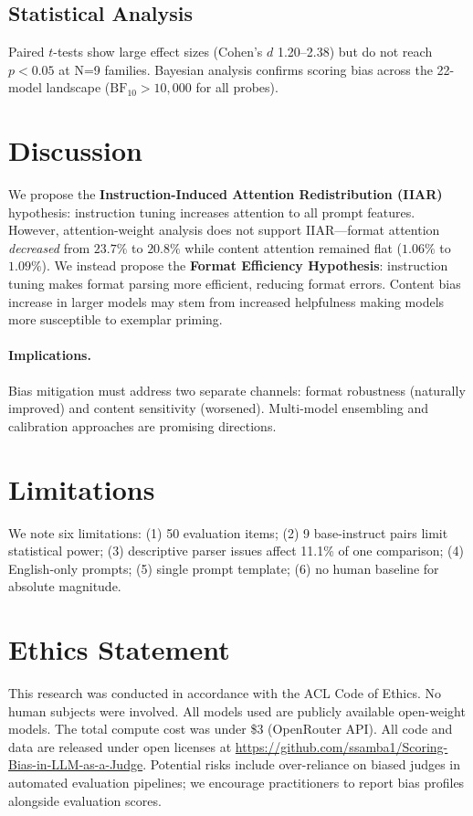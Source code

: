\documentclass[11pt,a4paper]{article}
\begin{document}
\subsection{Statistical Analysis}
Paired $t$-tests show large effect sizes (Cohen's $d$ 1.20--2.38) but do not reach $p<0.05$ at N=9 families. Bayesian analysis confirms scoring bias across the 22-model landscape ($\text{BF}_{10}>10{,}000$ for all probes).

\section{Discussion}

We propose the \textbf{Instruction-Induced Attention Redistribution (IIAR)} hypothesis: instruction tuning increases attention to all prompt features. However, attention-weight analysis does not support IIAR---format attention \emph{decreased} from $23.7\%$ to $20.8\%$ while content attention remained flat ($1.06\%$ to $1.09\%$). We instead propose the \textbf{Format Efficiency Hypothesis}: instruction tuning makes format parsing more efficient, reducing format errors. Content bias increase in larger models may stem from increased helpfulness making models more susceptible to exemplar priming.

\paragraph{Implications.} Bias mitigation must address two separate channels: format robustness (naturally improved) and content sensitivity (worsened). Multi-model ensembling and calibration approaches are promising directions.

\section{Limitations}

We note six limitations: (1) 50 evaluation items; (2) 9 base-instruct pairs limit statistical power; (3) descriptive parser issues affect 11.1\% of one comparison; (4) English-only prompts; (5) single prompt template; (6) no human baseline for absolute magnitude.

\section{Ethics Statement}

This research was conducted in accordance with the ACL Code of Ethics. No human subjects were involved. All models used are publicly available open-weight models. The total compute cost was under \$3 (OpenRouter API). All code and data are released under open licenses at \url{https://github.com/ssamba1/Scoring-Bias-in-LLM-as-a-Judge}. Potential risks include over-reliance on biased judges in automated evaluation pipelines; we encourage practitioners to report bias profiles alongside evaluation scores.
\end{document}
